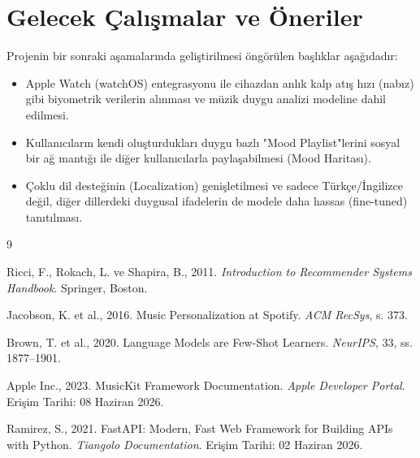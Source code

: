 \documentclass[12pt, a4paper]{report}
\begin{document}
\section{Gelecek Çalışmalar ve Öneriler}

Projenin bir sonraki aşamalarında geliştirilmesi öngörülen başlıklar aşağıdadır:
\begin{itemize}
    \item Apple Watch (watchOS) entegrasyonu ile cihazdan anlık kalp atış hızı (nabız) gibi biyometrik verilerin alınması ve müzik duygu analizi modeline dahil edilmesi.
    \item Kullanıcıların kendi oluşturdukları duygu bazlı "Mood Playlist"lerini sosyal bir ağ mantığı ile diğer kullanıcılarla paylaşabilmesi (Mood Haritası).
    \item Çoklu dil desteğinin (Localization) genişletilmesi ve sadece Türkçe/İngilizce değil, diğer dillerdeki duygusal ifadelerin de modele daha hassas (fine-tuned) tanıtılması.
\end{itemize}

\newpage
{}
{}
\renewcommand{\bibname}{KAYNAKLAR}
\begin{thebibliography}{9}

Ricci, F., Rokach, L. ve Shapira, B., 2011.
\textit{Introduction to Recommender Systems Handbook}.
Springer, Boston.

Jacobson, K. et al., 2016.
Music Personalization at Spotify.
\textit{ACM RecSys}, s. 373.

Brown, T. et al., 2020.
Language Models are Few-Shot Learners.
\textit{NeurIPS}, 33, ss. 1877--1901.

Apple Inc., 2023.
MusicKit Framework Documentation.
\textit{Apple Developer Portal}.
Erişim Tarihi: 08 Haziran 2026.

Ramirez, S., 2021.
FastAPI: Modern, Fast Web Framework for Building APIs with Python.
\textit{Tiangolo Documentation}.
Erişim Tarihi: 02 Haziran 2026.

\end{thebibliography}

\newpage
{}
{}
\end{document}
